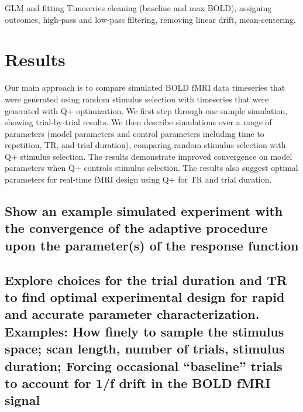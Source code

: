 \documentclass[
  man,floatsintext]{apa6}
\begin{document}
GLM and fitting
Timeseries cleaning (baseline and max BOLD), assigning outcomes, high-pass and low-pass filtering, removing linear drift, mean-centering.

\hypertarget{results}{%
\section{Results}\label{results}}

Our main approach is to compare simulated BOLD fMRI data timeseries that were generated using random stimulus selection with timeseries that were generated with Q+ optimization. We first step through one sample simulation, showing trial-by-trial results. We then describe simulations over a range of parameters (model parameters and control parameters including time to repetition, TR, and trial duration), comparing random stimulus selection with Q+ stimulus selection. The results demonstrate improved convergence on model parameters when Q+ controls stimulus selection. The results also suggest optimal parameters for real-time fMRI design using Q+ for TR and trial duration.

\hypertarget{show-an-example-simulated-experiment-with-the-convergence-of-the-adaptive-procedure-upon-the-parameters-of-the-response-function}{%
\subsection{Show an example simulated experiment with the convergence of the adaptive procedure upon the parameter(s) of the response function}\label{show-an-example-simulated-experiment-with-the-convergence-of-the-adaptive-procedure-upon-the-parameters-of-the-response-function}}

\hypertarget{explore-choices-for-the-trial-duration-and-tr-to-find-optimal-experimental-design-for-rapid-and-accurate-parameter-characterization.-examples-how-finely-to-sample-the-stimulus-space-scan-length-number-of-trials-stimulus-duration-forcing-occasional-baseline-trials-to-account-for-1f-drift-in-the-bold-fmri-signal}{%
\subsection{Explore choices for the trial duration and TR to find optimal experimental design for rapid and accurate parameter characterization. Examples: How finely to sample the stimulus space; scan length, number of trials, stimulus duration; Forcing occasional ``baseline'' trials to account for 1/f drift in the BOLD fMRI signal}\label{explore-choices-for-the-trial-duration-and-tr-to-find-optimal-experimental-design-for-rapid-and-accurate-parameter-characterization.-examples-how-finely-to-sample-the-stimulus-space-scan-length-number-of-trials-stimulus-duration-forcing-occasional-baseline-trials-to-account-for-1f-drift-in-the-bold-fmri-signal}}
\end{document}
